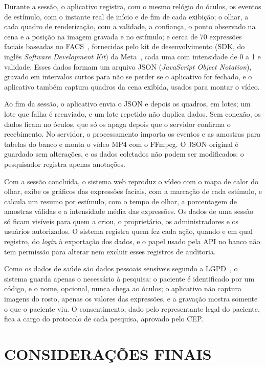 \documentclass[conference,a4paper,10pt]{IEEEtran}
\begin{document}
Durante a sessão, o aplicativo registra, com o mesmo relógio do óculos, os eventos de estímulo, com o instante real de início e de fim de cada exibição; o olhar, a cada quadro de renderização, com a validade, a confiança, o ponto observado na cena e a posição na imagem gravada e no estímulo; e cerca de 70 expressões faciais baseadas no FACS~\cite{EKMAN}, fornecidas pelo kit de desenvolvimento (SDK, do inglês \textit{Software Development Kit}) da Meta~\cite{META-MOVE}, cada uma com intensidade de 0 a 1 e validade. Esses dados formam um arquivo JSON (\textit{JavaScript Object Notation}), gravado em intervalos curtos para não se perder se o aplicativo for fechado, e o aplicativo também captura quadros da cena exibida, usados para montar o vídeo.

Ao fim da sessão, o aplicativo envia o JSON e depois os quadros, em lotes; um lote que falha é reenviado, e um lote repetido não duplica dados. Sem conexão, os dados ficam no óculos, que só os apaga depois que o servidor confirma o recebimento. No servidor, o processamento importa os eventos e as amostras para tabelas do banco e monta o vídeo MP4 com o FFmpeg. O JSON original é guardado sem alterações, e os dados coletados não podem ser modificados: o pesquisador registra apenas anotações.

Com a sessão concluída, o sistema web reproduz o vídeo com o mapa de calor do olhar, exibe os gráficos das expressões faciais, com a marcação de cada estímulo, e calcula um resumo por estímulo, com o tempo de olhar, a porcentagem de amostras válidas e a intensidade média das expressões. Os dados de uma sessão só ficam visíveis para quem a criou, o proprietário, os administradores e os usuários autorizados. O sistema registra quem fez cada ação, quando e em qual registro, do \textit{login} à exportação dos dados, e o papel usado pela API no banco não tem permissão para alterar nem excluir esses registros de auditoria.

Como os dados de saúde são dados pessoais sensíveis segundo a LGPD~\cite{LGPD}, o sistema guarda apenas o necessário à pesquisa: o paciente é identificado por um código, e o nome, opcional, nunca chega ao óculos; o aplicativo não captura imagens do rosto, apenas os valores das expressões, e a gravação mostra somente o que o paciente viu. O consentimento, dado pelo representante legal do paciente, fica a cargo do protocolo de cada pesquisa, aprovado pelo CEP.

\section{CONSIDERAÇÕES FINAIS}
\end{document}
